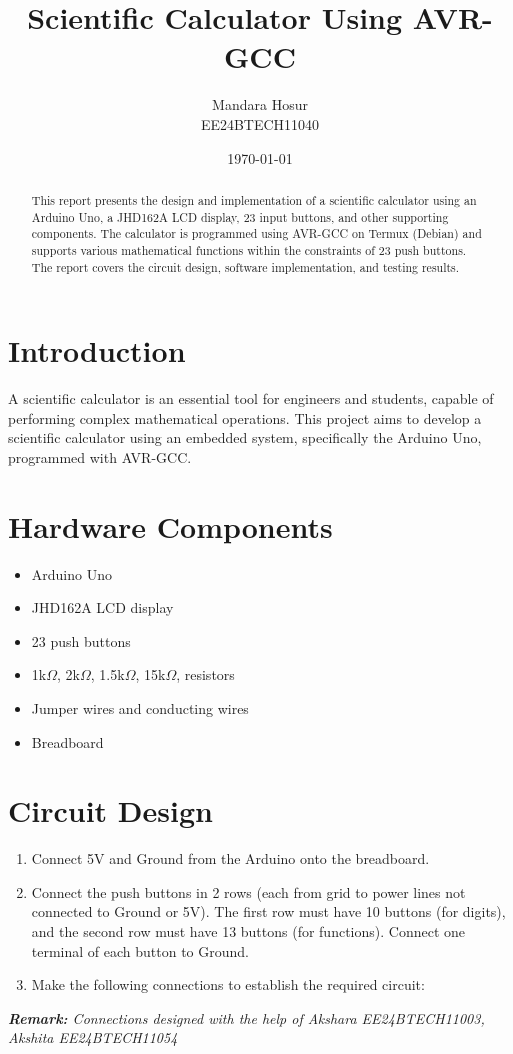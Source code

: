 \documentclass[12pt,a4paper]{article}
\title{\textbf{Scientific Calculator Using AVR-GCC}}
\author{Mandara Hosur \\EE24BTECH11040}
\date{\today}
\begin{document}
\maketitle

\begin{abstract}
This report presents the design and implementation of a scientific calculator using an Arduino Uno, a JHD162A LCD display, 23 input buttons, and other supporting components. The calculator is programmed using AVR-GCC on Termux (Debian) and supports various mathematical functions within the constraints of 23 push buttons. The report covers the circuit design, software implementation, and testing results.
\end{abstract}

\section{Introduction}
A scientific calculator is an essential tool for engineers and students, capable of performing complex mathematical operations. This project aims to develop a scientific calculator using an embedded system, specifically the Arduino Uno, programmed with AVR-GCC.

\section{Hardware Components}
\begin{itemize}
    \item Arduino Uno
    \item JHD162A LCD display
    \item 23 push buttons
    \item 1k$\Omega$, 2k$\Omega$, 1.5k$\Omega$, 15k$\Omega$,  resistors
    \item Jumper wires and conducting wires
    \item Breadboard
\end{itemize}

\section{Circuit Design}
\begin{enumerate}
    \item Connect 5V and Ground from the Arduino onto the breadboard.
    \item Connect the push buttons in 2 rows (each from grid to power lines not connected to Ground or 5V). The first row must have 10 buttons (for digits), and the second row must have 13 buttons (for functions). Connect one terminal of each button to Ground.
    \item Make the following connections to establish the required circuit:
    
\end{enumerate}
\textit{\textbf{Remark:} Connections designed with the help of Akshara EE24BTECH11003, Akshita EE24BTECH11054}
\end{document}

